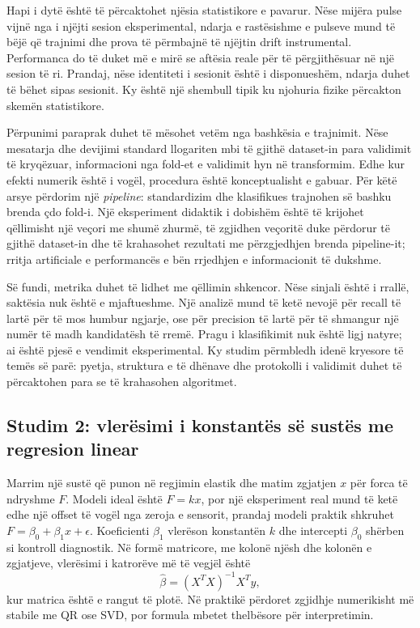 \documentclass[12pt,a4paper,oneside]{book}
\begin{document}
Hapi i dytë është të përcaktohet njësia statistikore e pavarur. Nëse mijëra pulse vijnë nga i njëjti sesion eksperimental, ndarja e rastësishme e pulseve mund të bëjë që trajnimi dhe prova të përmbajnë të njëjtin drift instrumental. Performanca do të duket më e mirë se aftësia reale për të përgjithësuar në një sesion të ri. Prandaj, nëse identiteti i sesionit është i disponueshëm, ndarja duhet të bëhet sipas sesionit. Ky është një shembull tipik ku njohuria fizike përcakton skemën statistikore.

Përpunimi paraprak duhet të mësohet vetëm nga bashkësia e trajnimit. Nëse mesatarja dhe devijimi standard llogariten mbi të gjithë dataset-in para validimit të kryqëzuar, informacioni nga fold-et e validimit hyn në transformim. Edhe kur efekti numerik është i vogël, procedura është konceptualisht e gabuar. Për këtë arsye përdorim një \emph{pipeline}: standardizim dhe klasifikues trajnohen së bashku brenda çdo fold-i. Një eksperiment didaktik i dobishëm është të krijohet qëllimisht një veçori me shumë zhurmë, të zgjidhen veçoritë duke përdorur të gjithë dataset-in dhe të krahasohet rezultati me përzgjedhjen brenda pipeline-it; rritja artificiale e performancës e bën rrjedhjen e informacionit të dukshme.

Së fundi, metrika duhet të lidhet me qëllimin shkencor. Nëse sinjali është i rrallë, saktësia nuk është e mjaftueshme. Një analizë mund të ketë nevojë për recall të lartë për të mos humbur ngjarje, ose për precision të lartë për të shmangur një numër të madh kandidatësh të rremë. Pragu i klasifikimit nuk është ligj natyre; ai është pjesë e vendimit eksperimental. Ky studim përmbledh idenë kryesore të temës së parë: pyetja, struktura e të dhënave dhe protokolli i validimit duhet të përcaktohen para se të krahasohen algoritmet.

\subsection*{Studim 2: vlerësimi i konstantës së sustës me regresion linear}
Marrim një sustë që punon në regjimin elastik dhe matim zgjatjen $x$ për forca të ndryshme $F$. Modeli ideal është $F=kx$, por një eksperiment real mund të ketë edhe një offset të vogël nga zeroja e sensorit, prandaj modeli praktik shkruhet $F=\beta_0+\beta_1x+\epsilon$. Koeficienti $\beta_1$ vlerëson konstantën $k$ dhe intercepti $\beta_0$ shërben si kontroll diagnostik. Në formë matricore, me kolonë njësh dhe kolonën e zgjatjeve, vlerësimi i katrorëve më të vegjël është
\[
\hat\beta=(X^TX)^{-1}X^T y,
\]
kur matrica është e rangut të plotë. Në praktikë përdoret zgjidhje numerikisht më stabile me QR ose SVD, por formula mbetet thelbësore për interpretimin.
\end{document}

